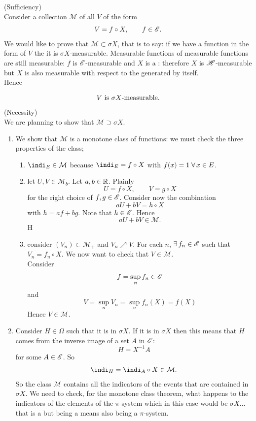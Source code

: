 \documentclass{report}
\begin{document}
\begin{fancyproof}
	(Sufficiency)\\
	Consider a collection $\mathcal{M}$ of all $V$ of the form 
	\[V=f\circ X,\qquad f\in\mathscr{E}.\]
	We would like to prove that $\mathcal{M}\subset\sigma X$, that is to say: if we have a function in the form of $V$ the it is $\sigma X$-measurable. Measurable functions of measurable functions are still measurable: $f$ is $\mathscr{E}$-measurable and $X$ is a \rv: therefore $X$ is $\mathscr{H}$-measurable but $X$ is also measurable with respect to the \sa{} generated by itself.\\
	Hence
	
	\[V\text{ is }\sigma X\text{-measurable.}\vspace{1cm}\]
	(Necessity)\\
	We are planning to show that $\mathcal{M}\supset \sigma X$. 
	\begin{enumerate}
		\item We show that $\mathcal{M}$ is a monotone class of functions: we must check the three properties of the class;
		\begin{enumerate}
			\item $\indi_E\in\mathcal{M}$ because $\indi_E=f\circ X$ with $f(x)=1\;\forall\, x\in E$.
			\item let $U,V\in\mathcal{M}_b$. Let $a,b\in\mathbb{R}$. Plainly
			\[U=f\circ X,\qquad V=g\circ X\]
			for the right choice of $f,g\in\mathscr{E}$. Consider now the combination
			\[aU+bV=h\circ X\]
			with $h=af+bg$. Note that $h\in\mathscr{E}$. Hence
			\[aU+bV\in\mathcal{M}.\] H
			\item consider $(V_n)\subset\mathcal{M}_+$ and $V_n\nearrow V$. For each $n$, $\exists\,f_n\in\mathscr{E}$ such that $V_n=f_n\circ X$. We now want to check that $V\in\mathcal{M}$.\\
			Consider 
			\[f=\sup_{n} f_n\in\mathscr{E}\]
			and
			\[V=\sup_{n}V_n=\sup_{n} f_{n}(X)=f(X)\]
			Hence $V\in\mathcal{M}$.
		\end{enumerate}
		\item Consider $H\in\Omega$ such that it is in $\sigma X$. If it is in $\sigma X$ then this means that $H$ comes from the inverse image of a set $A$ in $\mathscr{E}$:
		\[H=X^{-1}A\]
		for some $A\in\mathscr{E}$. So
		\[\indi_H=\indi_A\circ X\in\mathcal{M}.\]
		So the class $\mathcal{M}$ contains all the indicators of the events that are contained in $\sigma X$. We need to check, for the monotone class theorem, what happens to the indicators of the elements of the $\pi$-system which in this case would be $\sigma X$... that is a \sa{} but being a \sa{} means also being a $\pi$-system.\\

\end{enumerate}
\end{fancyproof}
\end{document}
